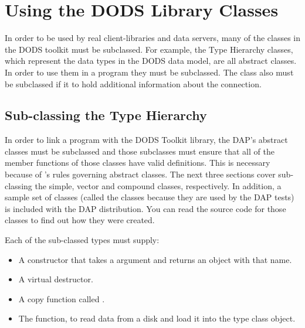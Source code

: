 %
%
%
%
%
%
%

\chapter{Using the DODS Library Classes}
\label{tk,subclassing}

In order to be used by real client-libraries and data servers, many of
the classes in the DODS toolkit must be subclassed. For example, the
Type Hierarchy classes, which represent the data types in the DODS
data model, are all abstract classes. In order to use them in a
program they must be subclassed. The  class also must
be subclassed if it to hold additional information about the
connection. 

\section{Sub-classing the Type Hierarchy}

In order to link a program with the DODS Toolkit library, the DAP's
abstract classes must be subclassed and those subclasses must ensure
that all of the member functions of those classes have valid
definitions. This is necessary because of \Cpp's rules governing
abstract classes. The next three sections cover sub-classing the
simple, vector and compound classes, respectively. In addition, a
sample set of classes (called the  classes because they are
used by the DAP tests) is included with the DAP distribution. You can
read the source code for those classes to find out how they were
created.

Each of the sub-classed types must supply:

\begin{itemize}
\item A constructor that takes a  argument and returns
  an object with that name.

\item A virtual destructor.

\item A copy function called .
  
\item The  function, to read data from a disk and load it
  into the type class object.

\end{itemize}

